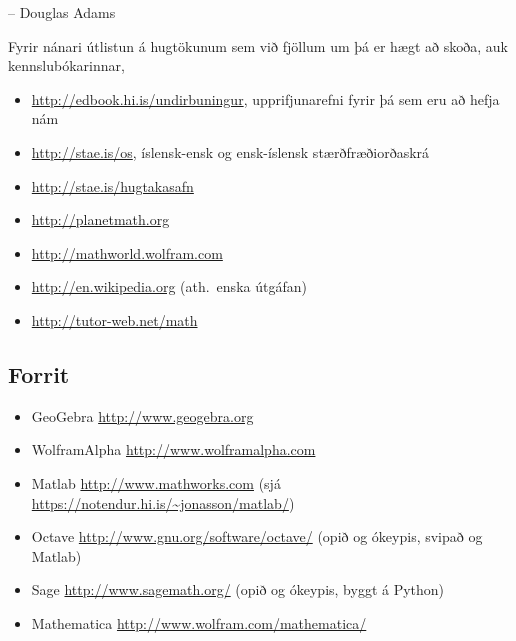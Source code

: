 \documentclass[a4paper,10pt,icelandic]{sphinxmanual}
\begin{document}
-- Douglas Adams

Fyrir nánari útlistun á hugtökunum sem við fjöllum um þá er hægt að skoða,
auk kennslubókarinnar,
\begin{itemize}
\item {} 
\href{http://edbook.hi.is/undirbuningur}{http://edbook.hi.is/undirbuningur}, upprifjunarefni fyrir þá sem eru að hefja nám

\item {} 
\href{http://stae.is/os}{http://stae.is/os}, íslensk-ensk og ensk-íslensk stærðfræðiorðaskrá

\item {} 
\href{http://stae.is/hugtakasafn}{http://stae.is/hugtakasafn}

\item {} 
\href{http://planetmath.org}{http://planetmath.org}

\item {} 
\href{http://mathworld.wolfram.com}{http://mathworld.wolfram.com}

\item {} 
\href{http://en.wikipedia.org}{http://en.wikipedia.org} (ath. enska útgáfan)

\item {} 
\href{http://tutor-web.net/math}{http://tutor-web.net/math}

\end{itemize}


\subsection{Forrit}
\label{vidauki:forrit}\begin{itemize}
\item {} 
GeoGebra \href{http://www.geogebra.org}{http://www.geogebra.org}

\item {} 
WolframAlpha \href{http://www.wolframalpha.com}{http://www.wolframalpha.com}

\item {} 
Matlab \href{http://www.mathworks.com}{http://www.mathworks.com}
(sjá \href{https://notendur.hi.is/~jonasson/matlab/}{https://notendur.hi.is/\textasciitilde{}jonasson/matlab/})

\item {} 
Octave \href{http://www.gnu.org/software/octave/}{http://www.gnu.org/software/octave/} (opið og ókeypis, svipað og Matlab)

\item {} 
Sage \href{http://www.sagemath.org/}{http://www.sagemath.org/}  (opið og ókeypis, byggt á Python)

\item {} 
Mathematica \href{http://www.wolfram.com/mathematica/}{http://www.wolfram.com/mathematica/}

\end{itemize}
\newpage
\end{document}
